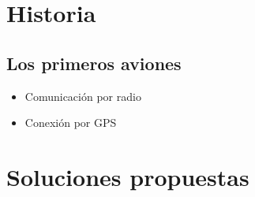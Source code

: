 \documentclass[a6paper]{article}
\begin{document}
    \section{Historia}
        \subsection{Los primeros aviones}
            \begin{itemize}
                \item Comunicación por radio
                \item Conexión por GPS
            \end{itemize}
    \section{Soluciones propuestas}
\end{document}
